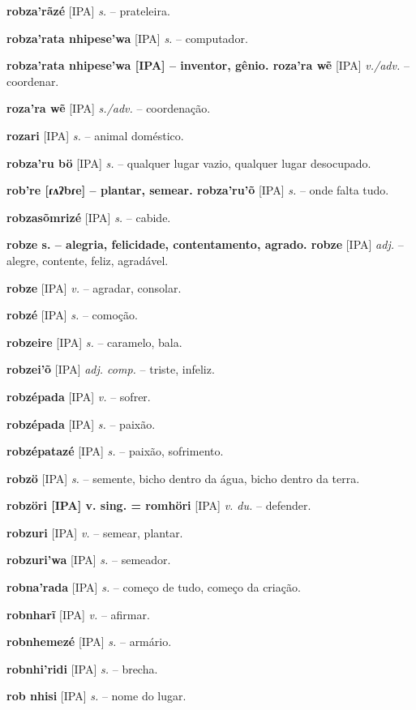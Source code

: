 \textbf{robza'rãzé} [IPA] \textit{s.} -- prateleira.

\textbf{robza'rata nhipese'wa} [IPA] \textit{s.} -- computador.

\textbf{robza'rata nhipese'wa [IPA]  -- inventor, gênio. roza'ra wẽ} [IPA] \textit{v./adv.} -- coordenar.

\textbf{roza'ra wẽ} [IPA] \textit{s./adv.} -- coordenação.

\textbf{rozari} [IPA] \textit{s.} -- animal doméstico.

\textbf{robza'ru bö} [IPA] \textit{s.} -- qualquer lugar vazio, qualquer lugar desocupado.

\textbf{rob're [ɾʌʔbɾe] -- plantar, semear. robza'ru'õ} [IPA] \textit{s.} -- onde falta tudo.

\textbf{robzasõmrizé} [IPA] \textit{s.} -- cabide.

\textbf{robze s. -- alegria, felicidade, contentamento, agrado. robze} [IPA] \textit{adj.} -- alegre, contente, feliz, agradável.

\textbf{robze} [IPA] \textit{v.} -- agradar, consolar.

\textbf{robzé} [IPA] \textit{s.} -- comoção.

\textbf{robzeire} [IPA] \textit{s.} -- caramelo, bala.

\textbf{robzei'õ} [IPA] \textit{adj. comp.} -- triste, infeliz.

\textbf{robzépada} [IPA] \textit{v.} -- sofrer.

\textbf{robzépada} [IPA] \textit{s.} -- paixão.

\textbf{robzépatazé} [IPA] \textit{s.} -- paixão, sofrimento.

\textbf{robzö} [IPA] \textit{s.} -- semente, bicho dentro da água, bicho dentro da terra.

\textbf{robzöri [IPA] v. sing. = romhöri} [IPA] \textit{v. du.} -- defender.

\textbf{robzuri} [IPA] \textit{v.} -- semear, plantar.

\textbf{robzuri'wa} [IPA] \textit{s.} -- semeador.

\textbf{robna'rada} [IPA] \textit{s.} -- começo de tudo, começo da criação.

\textbf{robnharĩ} [IPA] \textit{v.} -- afirmar.

\textbf{robnhemezé} [IPA] \textit{s.} -- armário.

\textbf{robnhi'ridi} [IPA] \textit{s.} -- brecha.

\textbf{rob nhisi} [IPA] \textit{s.} -- nome do lugar.

